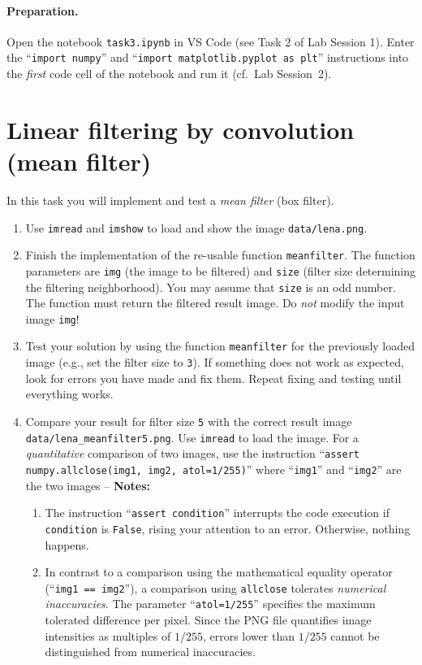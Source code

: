 \documentclass[12pt,a4paper]{article}
\begin{document}
\paragraph{Preparation.} Open the notebook \texttt{task3.ipynb} in VS Code (see Task 2 of Lab Session 1). Enter the ``\texttt{import numpy}'' and ``\texttt{import matplotlib.pyplot as plt}'' instructions into the \emph{first} code cell of the notebook and run it (cf.\ Lab Session~2).

\section{Linear filtering by convolution (mean filter)}
\label{task:boxfilter}
In this task you will implement and test a \emph{mean filter} (box filter).
\begin{enumerate}
    \item Use \texttt{imread} and \texttt{imshow} to load and show the image \texttt{data/lena.png}.
    \item Finish the implementation of the re-usable function \texttt{meanfilter}. The function parameters are \texttt{img} (the image to be filtered) and \texttt{size} (filter size determining the filtering neighborhood). You may assume that \texttt{size} is an odd number. The function must return the filtered result image. Do \emph{not} modify the input image \texttt{img}!
    \item Test your solution by using the function \texttt{meanfilter} for the previously loaded image (e.g., set the filter size to \texttt{3}). If something does not work as expected, look for errors you have made and fix them. Repeat fixing and testing until everything works.
    \item Compare your result for filter size \texttt{5} with the correct result image \texttt{data/lena\_mean\-fil\-ter5.png}. Use \texttt{imread} to load the image. For a \emph{quantitative} comparison of two images, use the instruction ``\texttt{assert numpy.allclose(img1, img2, atol=1/255)}'' where ``\texttt{img1}'' and ``\texttt{img2}'' are the two images -- \textbf{Notes:}
    \begin{enumerate}
        \item The instruction ``\texttt{assert condition}'' interrupts the code execution if \texttt{condition} is \texttt{False}, rising your attention to an error. Otherwise, nothing happens.
        \item In contrast to a comparison using the mathematical equality operator (``\texttt{img1 == img2}''), a comparison using \texttt{allclose} tolerates \emph{numerical inaccuracies}. The parameter ``\texttt{atol=1/255}'' specifies the maximum tolerated difference per pixel. Since the PNG file quantifies image intensities as multiples of $1/255$, errors lower than $1/255$ cannot be distinguished from numerical inaccuracies.
    \end{enumerate}
\end{enumerate}
\end{document}
